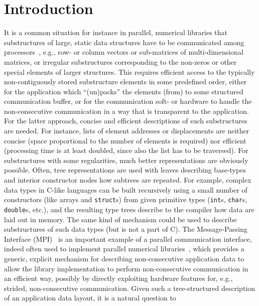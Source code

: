 \documentclass[a4paper,11pt]{article}
\begin{document}
\section{Introduction}
\label{sec:introduction}
It is a common situation for instance in parallel, numerical libraries
that substructures of large, static data structures have to be
communicated among
processors~\cite{ChoiDongarraOstrouchovPetitetWalkerWhaley96,PoulsonMarkerHammondRomerovandeGeijn13},
e.g., row- or column vectors or sub-matrices of multi-dimensional
matrices, or irregular substructures corresponding to the non-zeros or
other special elements of larger structures. This requires efficient
access to the typically non-contiguously stored substructure elements
in some predefined order, either for the application which
``(un)packs'' the elements (from) to some structured communication
buffer, or for the communication soft- or hardware to handle the
non-consecutive communication in a way that is transparent to the
application. For the latter approach, concise and efficient
descriptions of such substructures are needed. For instance, lists of
element addresses or displacements are neither concise (space
proportional to the number of elements is required) nor efficient
(processing time is at least doubled, since also the list has to be
traversed). For substructures with some regularities, much better
representations are obviously possible. Often, tree representations
are used with leaves describing base-types and interior constructor
nodes how subtrees are repeated. For example, complex data types in
C-like languages can be built recursively using a small number of
constructors (like arrays and \texttt{struct}s) from given primitive
types (\texttt{int}s, \texttt{char}s, \texttt{double}s, etc.), and the
resulting type trees describe to the compiler how data are laid out in
memory. The same kind of mechanism could be used to describe
substructures of such data types (but is not a part of C). The
Message-Passing Interface (MPI)~\cite{MPI-3.0} is an important example
of a parallel communication interface, indeed often used to implement
parallel numerical
libraries~\cite{ChoiDongarraOstrouchovPetitetWalkerWhaley96,PoulsonMarkerHammondRomerovandeGeijn13},
which provides a generic, explicit mechanism for describing
non-consecutive application data to allow the library implementation
to perform non-consecutive communication in an efficient way, possibly
by directly exploiting hardware features for, e.g., strided,
non-consecutive communication. Given such a tree-structured
description of an application data layout, it is a natural question to
\end{document}

